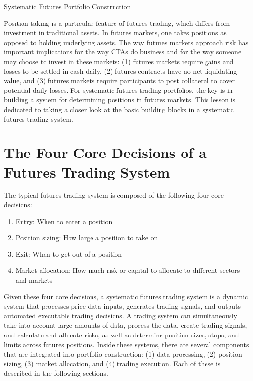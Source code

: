 \documentclass[11pt]{article}
\begin{document}
Systematic Futures Portfolio Construction

Position taking is a particular feature of futures trading, which differs from investment in traditional assets. In futures markets, one takes positions as opposed to holding underlying assets. The way futures markets approach risk has important implications for the way CTAs do business and for the way someone may choose to invest in these markets: (1) futures markets require gains and losses to be settled in cash daily, (2) futures contracts have no net liquidating value, and (3) futures markets require participants to post collateral to cover potential daily losses. For systematic futures trading portfolios, the key is in building a system for determining positions in futures markets. This lesson is dedicated to taking a closer look at the basic building blocks in a systematic futures trading system.

\section*{The Four Core Decisions of a Futures Trading System}
The typical futures trading system is composed of the following four core decisions:

\begin{enumerate}
  \item Entry: When to enter a position

  \item Position sizing: How large a position to take on

  \item Exit: When to get out of a position

  \item Market allocation: How much risk or capital to allocate to different sectors and markets

\end{enumerate}

Given these four core decisions, a systematic futures trading system is a dynamic system that processes price data inputs, generates trading signals, and outputs automated executable trading decisions. A trading system can simultaneously take into account large amounts of data, process the data, create trading signals, and calculate and allocate risks, as well as determine position sizes, stops, and limits across futures positions. Inside these systems, there are several components that are integrated into portfolio construction: (1) data processing, (2) position sizing, (3) market allocation, and (4) trading execution. Each of these is described in the following sections.
\end{document}
